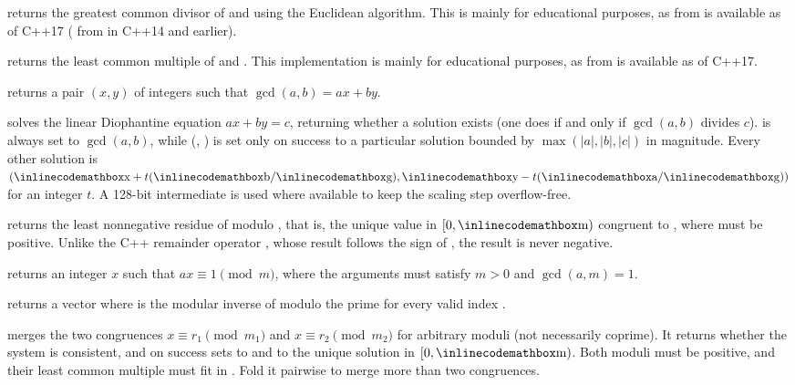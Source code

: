 \begin{compactitem}
  \item {} returns the greatest common divisor of  and  using the Euclidean algorithm. This is mainly for educational purposes, as  from  is available as of C++17 ( from  in C++14 and earlier).
  \item {} returns the least common multiple of  and . This implementation is mainly for educational purposes, as  from  is available as of C++17.
  \item {} returns a pair $(x, y)$ of integers such that $\gcd(a, b) = ax + by$.
  \item {} solves the linear Diophantine equation $ax + by = c$, returning whether a solution exists (one does if and only if $\gcd(a, b)$ divides $c$).  is always set to $\gcd(a, b)$, while (, ) is set only on success to a particular solution bounded by $\max(|a|, |b|, |c|)$ in magnitude. Every other solution is $({\inlinecodemath{x}} + t({\inlinecodemath{b}}/{\inlinecodemath{g}}), {\inlinecodemath{y}} - t({\inlinecodemath{a}}/{\inlinecodemath{g}}))$ for an integer $t$. A 128-bit intermediate is used where available to keep the scaling step overflow-free.
  \item {} returns the least nonnegative residue of  modulo , that is, the unique value in $[0, {\inlinecodemath{m}})$ congruent to , where  must be positive. Unlike the C++ remainder operator \inlinecode{\%}, whose result follows the sign of , the result is never negative.
  \item {} returns an integer $x$ such that $ax \equiv 1 \pmod m$, where the arguments must satisfy $m > 0$ and $\gcd(a, m) = 1$.
  \item {} returns a vector  where  is the modular inverse of  modulo the prime  for every valid index .
  \item {} merges the two congruences $x \equiv r_1 \pmod{m_1}$ and $x \equiv r_2 \pmod{m_2}$ for arbitrary moduli (not necessarily coprime). It returns whether the system is consistent, and on success sets  to  and  to the unique solution in $[0, {\inlinecodemath{m}})$. Both moduli must be positive, and their least common multiple must fit in . Fold it pairwise to merge more than two congruences.

\end{compactitem}

